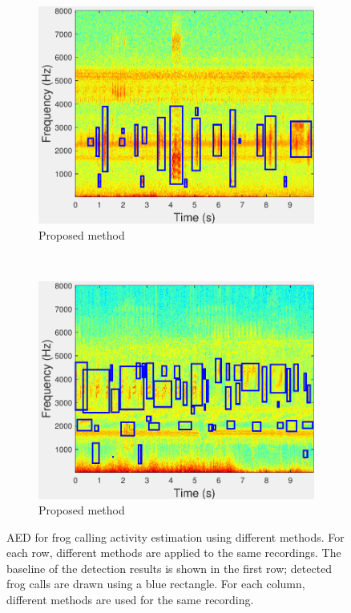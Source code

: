 \begin{figure}
                \begin{subfigure}[b]{0.35\textwidth}
       \includegraphics[width=\textwidth]{image/Ch7/AED_Jie.pdf}
                \caption{Proposed method}
        \end{subfigure}     
~
        \begin{subfigure}[b]{0.35\textwidth}
       \includegraphics[width=\textwidth]{image/Ch7/AED_Jie_2.pdf}
                \caption{Proposed method}
        \end{subfigure}                
        \caption[AED for frog abundance monitoring using different methods]{AED for frog calling activity estimation using different methods. For each row, different methods are applied to the same recordings. The baseline of the detection results is shown in the first row; detected frog calls are drawn using a blue rectangle. For each column, different methods are used for the same recording.}        
        \label{fig:Ch7_AED}
\end{figure}



